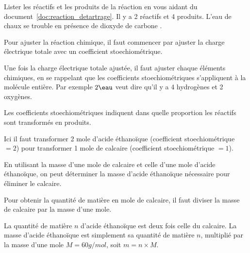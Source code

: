 \newpage
\pasDePagination
\setcounter{coupDePouceNum}{0}
\vspace*{-52pt}

%
\begin{coupDePouce}
  Lister les réactifs et les produits de la réaction en vous aidant du document~\ref{doc:reaction_detartrage}.
  Il y a 2 réactifs et 4 produits.
  L'eau de chaux se trouble en présence de dioxyde de carbone \dioxydeDeCarbone.
\end{coupDePouce}

%
\begin{coupDePouce}
  Pour ajuster la réaction chimique, il faut commencer par ajuster la charge électrique totale avec un coefficient stoechiométrique.
  
  Une fois la charge électrique totale ajustée, il faut ajuster chaque éléments chimiques, en se rappelant que les coefficients stoechiométriques s'appliquent à la molécule entière. 
  Par exemple $2\eau$ veut dire qu'il y a 4 hydrogènes et 2 oxygènes.
\end{coupDePouce}

%
\begin{coupDePouce}
  Les coefficients stoechiométriques indiquent dans quelle proportion les réactifs sont transformés en produits.
  
  Ici il faut transformer 2 mole d'acide éthanoïque (coefficient stoechiométrique $ = 2$) pour transformer 1 mole de calcaire (coefficient stoechiométrique $ = 1$).
  
  En utilisant la masse d'une mole de calcaire et celle d'une mole d'acide éthanoïque, on peut déterminer la masse d'acide éthanoïque nécessaire pour éliminer le calcaire.
\end{coupDePouce}

%
\begin{coupDePouce}
  Pour obtenir la quantité de matière en mole de calcaire, il faut diviser la masse de calcaire par la masse d'une mole.
  
  La quantité de matière $n$ d'acide éthanoïque est deux fois celle du calcaire.
  La masse d'acide éthanoïque est simplement sa quantité de matière $n$, multiplié par la masse d'une mole $M = 60 \unit{g / mol}$, soit $m = n \times M$.
\end{coupDePouce}

